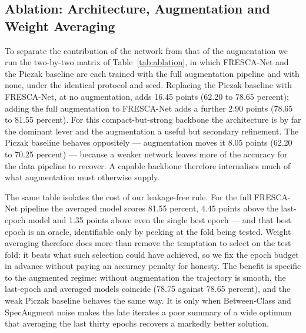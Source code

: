 \documentclass[conference]{IEEEtran}
\begin{document}
\subsection{Ablation: Architecture, Augmentation and Weight Averaging}
To separate the contribution of the network from that of the augmentation we run the two-by-two matrix of Table~\ref{tab:ablation}, in which FRESCA-Net and the Piczak baseline are each trained with the full augmentation pipeline and with none, under the identical protocol and seed. Replacing the Piczak baseline with FRESCA-Net, at no augmentation, adds 16.45 points (62.20 to 78.65 percent); adding the full augmentation to FRESCA-Net adds a further 2.90 points (78.65 to 81.55 percent). For this compact-but-strong backbone the architecture is by far the dominant lever and the augmentation a useful but secondary refinement. The Piczak baseline behaves oppositely --- augmentation moves it 8.05 points (62.20 to 70.25 percent) --- because a weaker network leaves more of the accuracy for the data pipeline to recover. A capable backbone therefore internalises much of what augmentation must otherwise supply.

The same table isolates the cost of our leakage-free rule. For the full FRESCA-Net pipeline the averaged model scores 81.55 percent, 4.45 points above the last-epoch model and 1.35 points above even the single best epoch --- and that best epoch is an oracle, identifiable only by peeking at the fold being tested. Weight averaging therefore does more than remove the temptation to select on the test fold: it beats what such selection could have achieved, so we fix the epoch budget in advance without paying an accuracy penalty for honesty. The benefit is specific to the augmented regime: without augmentation the trajectory is smooth, the last-epoch and averaged models coincide (78.75 against 78.65 percent), and the weak Piczak baseline behaves the same way. It is only when Between-Class and SpecAugment noise makes the late iterates a poor summary of a wide optimum that averaging the last thirty epochs recovers a markedly better solution.
\end{document}
